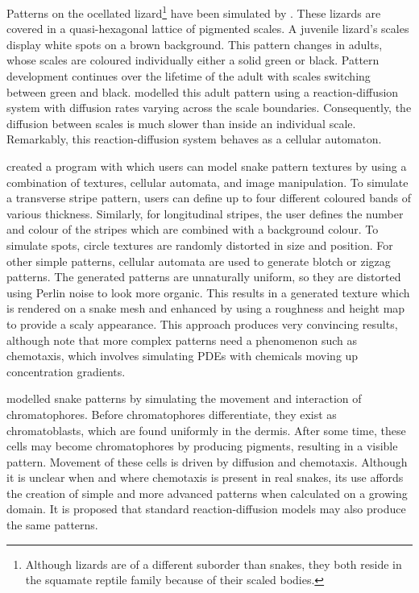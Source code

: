 Patterns on the ocellated lizard\footnote{Although lizards are of a different suborder than snakes, they both reside in the squamate reptile family because of their scaled bodies.} have been simulated by \citet{manukyan2017}. These lizards are covered in a quasi-hexagonal lattice of pigmented scales. A juvenile lizard's scales display white spots on a brown background. This pattern changes in adults, whose scales are coloured individually either a solid green or black. Pattern development continues over the lifetime of the adult with scales switching between green and black. \citet{manukyan2017} modelled this adult pattern using a reaction-diffusion system with diffusion rates varying across the scale boundaries. Consequently, the diffusion between scales is much slower than inside an individual scale. Remarkably, this reaction-diffusion system behaves as a cellular automaton.

\citet{pinheiro2017} created a program with which users can model snake pattern textures by using a combination of textures, cellular automata, and image manipulation. To simulate a transverse stripe pattern, users can define up to four different coloured bands of various thickness. Similarly, for longitudinal stripes, the user defines the number and colour of the stripes which are combined with a background colour. To simulate spots, circle textures are randomly distorted in size and position. For other simple patterns, cellular automata are used to generate blotch or zigzag patterns. The generated patterns are unnaturally uniform, so they are distorted using Perlin noise to look more organic. This results in a generated texture which is rendered on a snake mesh and enhanced by using a roughness and height map to provide a scaly appearance. This approach produces very convincing results, although \citet{pinheiro2017} note that more complex patterns need a phenomenon such as chemotaxis, which involves simulating PDEs with chemicals moving up concentration gradients.

\citet{MURRAY1991} modelled snake patterns by simulating the movement and interaction of chromatophores. Before chromatophores differentiate, they exist as chromatoblasts, which are found uniformly in the dermis. After some time, these cells may become chromatophores by producing pigments, resulting in a visible pattern. Movement of these cells is driven by diffusion and chemotaxis. Although it is unclear when and where chemotaxis is present in real snakes, its use affords the creation of simple and more advanced patterns when calculated on a growing domain. It is proposed that standard reaction-diffusion models may also produce the same patterns.

